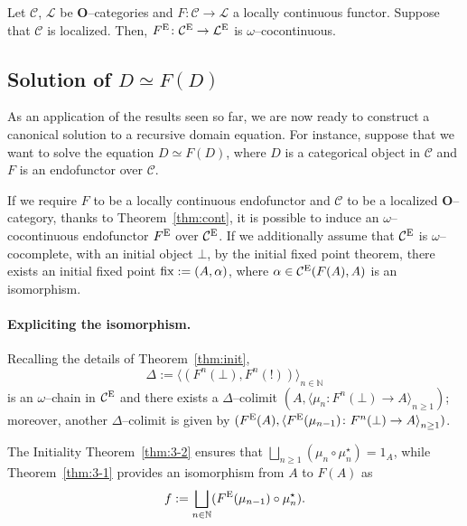 \begin{thm}\label{thm:cont}
  Let \(\mathcal{C}\), \(\mathcal{L}\) be \(\mathbf{O}\)--categories and \(F \colon \mathcal{C} \to \mathcal{L}\) a locally continuous functor.
  Suppose that \(\mathcal{C}\) is localized.
  Then, \(F^\textup{E} \colon \mathcal{C}^\textup{E} \to \mathcal{L}^\textup{E}\) is \(\omega\)--cocontinuous. %
\end{thm}

\subsection{Solution of \(D \simeq F(D)\)}

As an application of the results seen so far, we are now ready to construct a canonical solution to a recursive domain equation.
For instance, suppose that we want to solve the equation \(D \simeq F(D)\), where \(D\) is a categorical object in \(\mathcal{C}\) and \(F\) is an endofunctor over \(\mathcal{C}\).

If we require \(F\) to be a locally continuous endofunctor and \(\mathcal{C}\) to be a localized \(\mathbf{O}\)--category, thanks to Theorem~\ref{thm:cont}, it is possible to induce an \(\omega\)--cocontinuous endofunctor \(F^\textup{E}\) over \(\mathcal{C}^\textup{E}\). %
If we additionally assume that \(\mathcal{C}^\textup{E}\) is \(\omega\)--cocomplete, with an initial object \(\bot\), by the initial fixed point theorem, there exists an initial fixed point \(\operatorname{fix} := (A,\alpha)\), where \(\alpha \in \mathcal{C}^\textup{E}(F(A), A)\) is an isomorphism. %

\paragraph{Expliciting the isomorphism.}
Recalling the details of Theorem~\ref{thm:init},
\begin{equation*}
  \Delta := {\langle(F^n(\bot),F^n(!))\rangle}_{n \in \mathbb{N}}
\end{equation*}
is an \(\omega\)--chain in \(\mathcal{C}^\textup{E}\) and there exists a \(\Delta\)--colimit \((A, {\langle \mu_n \colon F^n(\bot) \to A \rangle}_{n \ge 1})\); moreover, another \(\Delta\)--colimit is given by \((F^\textup{E}(A), {\langle F^\textup{E}(\mu_{n-1}) \colon F^n(\bot) \to A \rangle}_{n \ge 1})\). %

The Initiality Theorem~\ref{thm:3-2} ensures that \(\bigsqcup_{n \ge 1}(\mu_n \circ \mu_n^\star) = 1_A\), while Theorem~\ref{thm:3-1} provides an isomorphism from \(A\) to \(F(A)\) as
\begin{equation*}
  f := \bigsqcup_{n \in \mathbb{N}}(F^\textup{E}(\mu_{n-1}) \circ \mu_n^\star).
\end{equation*}

